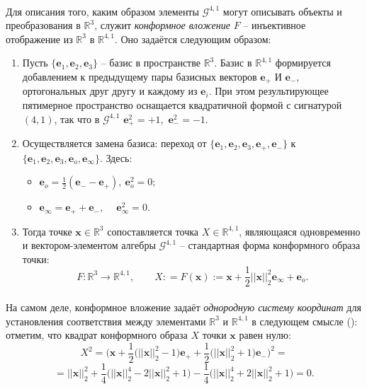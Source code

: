 \documentclass[12pt]{article}
\begin{document}
\paragraph{}
Для описания того, каким образом элементы $\mathcal{G}^{4,1}$ могут описывать объекты и преобразования в $\mathds{R}^3$, служит \textit{конформное вложение} $F$ -- инъективное отображение из $\mathds{R}^3$ в $\mathds{R}^{4,1}$. Оно задаётся следующим образом:
\begin{enumerate}
    \item Пусть $\{\mathbf{e}_1, \mathbf{e}_2, \mathbf{e}_3\}$ -- базис в пространстве $\mathds{R}^3$. Базис в $\mathds{R}^{4,1}$ формируется добавлением к предыдущему пары базисных векторов $\mathbf{e}_+$ И $\mathbf{e}_-$, ортогональных друг другу и каждому из $\mathbf{e}_i$. При этом результирующее пятимерное пространство оснащается квадратичной формой с сигнатурой $(4,1)$, так что в $\mathcal{G}^{4,1}$ $\mathbf{e}_+^2 = +1,$ $\mathbf{e}_-^2 = -1$.
    \item Осуществляется замена базиса: переход от $\{\mathbf{e}_1, \mathbf{e}_2, \mathbf{e}_3, \mathbf{e}_+, \mathbf{e}_-\}$ к $\{\mathbf{e}_1, \mathbf{e}_2, \mathbf{e}_3, \mathbf{e}_o, \mathbf{e}_{\infty}\}$. Здесь:
    \begin{itemize}
        \item[] $\mathbf{e}_o = \frac{1}{2}(\mathbf{e}_- - \mathbf{e}_+), \ \mathbf{e}_o^2 = 0;$
        \item[] $\mathbf{e}_{\infty} = \mathbf{e}_+ + \mathbf{e}_-, \quad \   \mathbf{e}_{\infty}^2 = 0.$
    \end{itemize}
    
    \item Тогда точке $\mathbf{x} \in \mathds{R}^3$ сопоставляется точка  $X \in \mathds{R}^{4,1}$, являющаяся одновременно и вектором-элементом алгебры $\mathcal{G}^{4,1}$ -- стандартная форма конформного образа точки:
    $$F:\mathds{R}^3 \rightarrow \mathds{R}^{4,1}, \quad \quad X: = F(\mathbf{x}) := \mathbf{x} + \frac{1}{2}||\mathbf{x}||_2^2 \mathbf{e}_{\infty} + \mathbf{e}_o.$$

    \end{enumerate}
    
    \paragraph{}
    На самом деле, конформное вложение задаёт \textit{однородную систему координат} для установления соответствия между элементами $\mathds{R}^3$ и $\mathds{R}^{4,1}$ в следующем смысле (\cite{Miller2013GeometricAA}): отметим, что квадрат конформного образа $X$ точки $\mathbf{x}$ равен нулю:
    $$ X^2 = \Big(\mathbf{x} + \frac{1}{2}\big(||\mathbf{x}||_2^2 - 1\big)\mathbf{e}_+ + \frac{1}{2}\big(||\mathbf{x}||_2^2 + 1\big)\mathbf{e}_-\Big)^2 = $$
    $$ = ||\mathbf{x}||_2^2 + \frac{1}{4}\big(||\mathbf{x}||_2^4 - 2||\mathbf{x}||_2^2 + 1\big) - \frac{1}{4}\big(||\mathbf{x}||_2^4 + 2||\mathbf{x}||_2^2 + 1\big) = 0.$$
\end{document}
